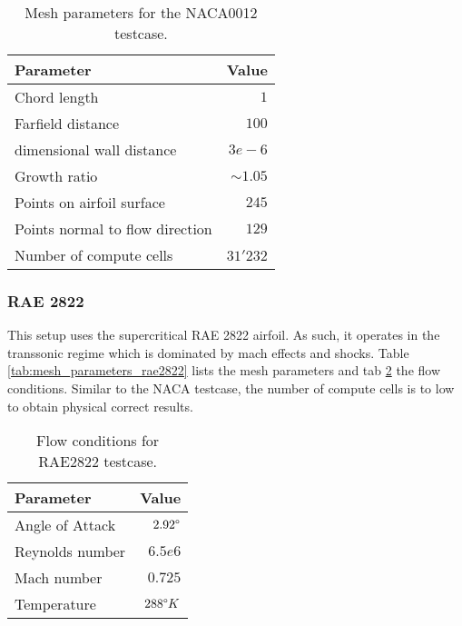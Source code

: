 \begin{table}[H]
    \centering
    \begin{tabular}{l r}
        \toprule
        Parameter                           & Value \\
        \midrule
        Chord length                        & $1$ \\
        Farfield distance                   & $100$ \\
        dimensional wall distance           & $3e-6$ \\
        Growth ratio                        & $\sim 1.05$ \\
        Points on airfoil surface           & $245$\\
        Points normal to flow direction     & $129$ \\
        Number of compute cells             & $31'232$\\
        \bottomrule
    \end{tabular}
    \caption{Mesh parameters for the NACA0012 testcase.}
    \label{tab:mesh_parameters_n0012}
\end{table}


\subsubsection{RAE 2822}
This setup uses the supercritical RAE 2822 airfoil. As such, it operates in the
transsonic regime which is dominated by mach effects and shocks. Table
\ref{tab:mesh_parameters_rae2822} lists the mesh parameters and tab
\ref{tab:flow_conditions_rae2822} the flow conditions. Similar to the NACA
testcase, the number of compute cells is to low to obtain physical correct
results. 

\begin{table}[H]
    \centering
    \begin{tabular}{l r}
        \toprule
        Parameter                           & Value \\
        \midrule
        Angle of Attack                     & $2.92 \degree$ \\
        Reynolds number                     & $6.5e6$ \\
        Mach number                         & $0.725$ \\
        Temperature                         & $288 \degree K$\\
        \bottomrule
    \end{tabular}
    \caption{Flow conditions for RAE2822 testcase.}
    \label{tab:flow_conditions_rae2822}
\end{table}

